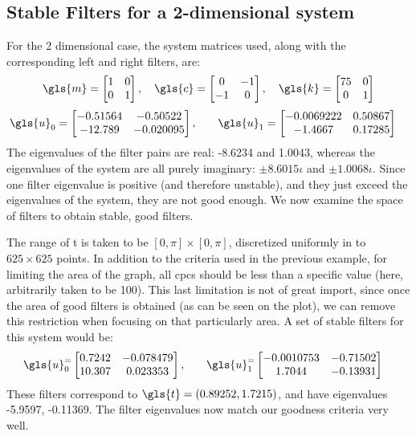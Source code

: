 \subsection{Stable Filters for a 2-dimensional system}
\label{sec:2d}
For the 2 dimensional case, the system matrices used, along with 
the corresponding left and right filters, are:
\begin{align}
	\gls{m} = \begin{bmatrix}
	1 & 0\\
	0 & 1
	\end{bmatrix}, \quad
	\gls{c}= \begin{bmatrix}
	0 & -1\\
	-1 & 0
	\end{bmatrix},\quad
	\gls{k} = \begin{bmatrix}
	75 & 0\\
	0 & 1
	\end{bmatrix}
\end{align}
\begin{align}
	\gls{u}_0 = \begin{bmatrix}	
     -0.51564   &  -0.50522\\
      -12.789   & -0.020095
	\end{bmatrix}, &\qquad
	\gls{u}_1= \begin{bmatrix}
	-0.0069222   &  0.50867 \\
      -1.4667    &  0.17285
	\end{bmatrix}
\end{align}
The eigenvalues of the filter pairs are real: -8.6234 and 1.0043, whereas the 
eigenvalues of the system are all purely imaginary: $ \pm8.6015\iota$ and 
$\pm1.0068\iota$. Since one filter eigenvalue is positive (and therefore 
unstable), and they just exceed the eigenvalues of the system, they are 
not good enough. We now examine the space of filters to obtain stable, 
good filters.

The range of \gls{t} is taken to be $[0, \pi] \times [0, \pi]$, 
discretized uniformly in to $625\times 625$ points.  In addition to the 
criteria used in the previous example, for limiting the area of the graph, 
all \glspl{cpc} should be less than a specific value (here, arbitrarily 
taken to be 100). This last limitation is not of great import, since once 
the area of good filters is obtained (as can be seen on the plot), we can 
remove this restriction when focusing on that particularly area. 
A set of stable filters for this system would be:
\begin{align}
	\gls{u}_0^ = \begin{bmatrix}	
     0.7242   &  -0.078479\\
      10.307   & 0.023353
	\end{bmatrix}, &\qquad
	\gls{u}_1^= \begin{bmatrix}
	-0.0010753   &  -0.71502 \\
      1.7044    &  -0.13931
	\end{bmatrix}
\end{align}
These filters correspond to $\gls{t} = (0.89252, 1.7215)$, and
have eigenvalues -5.9597, -0.11369. The filter eigenvalues now match 
our goodness criteria very well.

